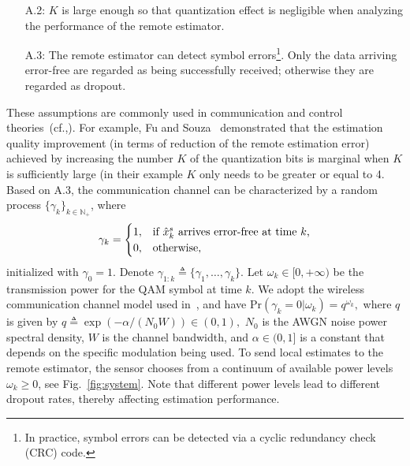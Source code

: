 \documentclass[twocolumn]{autart}    \usepackage{cite}
\begin{document}
{\begin{enumerate}
\item[A.2:]
$K$ is large enough so that quantization effect is negligible when
analyzing the performance of the remote estimator.
\item[A.3:]\label{asmpt:assumption-SER-2-gamma}
The remote estimator can
detect symbol errors\footnote{In practice, symbol errors can be detected via a cyclic redundancy check (CRC) code.}. Only the
data arriving error-free are regarded as being successfully received; otherwise they are regarded as dropout.
\end{enumerate}
\vspace{-3.5mm}
These assumptions are commonly used in communication and control
{theories~(cf.,\cite{sinopoli2004kalman,fu2009Automatica,queahl10,leong2012power,GatsisACC13}).}
{For example, Fu and Souza~\cite{fu2009Automatica} demonstrated that the estimation quality improvement (in terms of reduction of the remote estimation error) achieved by
increasing the number $K$ of the quantization bits is marginal when $K$ is sufficiently large (in their example $K$ only needs to be greater or equal to 4.} Based on A.3, the communication channel can be characterized by a random process $\{\gamma_k\}_{k\in\mathbb{N}_+}$, where\vspace{-1mm}
\begin{equation*} \gamma_k =
  \begin{cases}
  1, &\text{if $\hat{x}^s_k$ arrives error-free at time $k$,}\\
  0, & \text{otherwise,}
  \end{cases}\vspace{-1mm}
\end{equation*}
initialized with $\gamma_0=1$.
{Denote $\gamma_{1:k}\triangleq \{\gamma_1,\ldots,\gamma_k\}.$}
Let $\omega_k\in[0,+\infty)$ be the transmission power for the QAM symbol
at time $k$.
We adopt the wireless communication channel model used in~\cite{Liyuzhe13CDC}, and have
${\mathrm{Pr}} \left(\gamma_k=0|\omega_k\right)=q^{\omega_k},$
where $q$ is given by $q\triangleq \exp( -\alpha /({N_0W}))\in(0,1),$
$N_0$ is the AWGN noise power spectral
density, $W$ is the channel bandwidth, and $\alpha\in (0,1]$ is a
constant that depends on the specific modulation being used.
To send local estimates to the remote estimator, the sensor chooses from a continuum of available power levels $\omega_k\geqslant 0$, see
Fig.~\ref{fig:system}. Note that different power levels lead to different
dropout rates, thereby affecting estimation performance.


}
\end{document}

